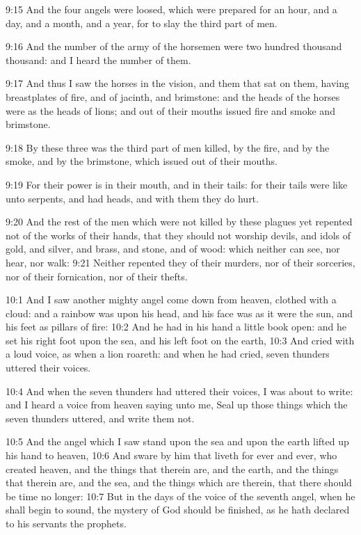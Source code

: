 9:15 And the four angels were loosed, which were prepared for an hour, and a day, and a month, and a year, for to slay the third part of men.

9:16 And the number of the army of the horsemen were two hundred thousand thousand: and I heard the number of them.

9:17 And thus I saw the horses in the vision, and them that sat on them, having breastplates of fire, and of jacinth, and brimstone: and the heads of the horses were as the heads of lions; and out of their mouths issued fire and smoke and brimstone.

9:18 By these three was the third part of men killed, by the fire, and by the smoke, and by the brimstone, which issued out of their mouths.

9:19 For their power is in their mouth, and in their tails: for their tails were like unto serpents, and had heads, and with them they do hurt.

9:20 And the rest of the men which were not killed by these plagues yet repented not of the works of their hands, that they should not worship devils, and idols of gold, and silver, and brass, and stone, and of wood: which neither can see, nor hear, nor walk: 9:21 Neither repented they of their murders, nor of their sorceries, nor of their fornication, nor of their thefts.

10:1 And I saw another mighty angel come down from heaven, clothed with a cloud: and a rainbow was upon his head, and his face was as it were the sun, and his feet as pillars of fire: 10:2 And he had in his hand a little book open: and he set his right foot upon the sea, and his left foot on the earth, 10:3 And cried with a loud voice, as when a lion roareth: and when he had cried, seven thunders uttered their voices.

10:4 And when the seven thunders had uttered their voices, I was about to write: and I heard a voice from heaven saying unto me, Seal up those things which the seven thunders uttered, and write them not.

10:5 And the angel which I saw stand upon the sea and upon the earth lifted up his hand to heaven, 10:6 And sware by him that liveth for ever and ever, who created heaven, and the things that therein are, and the earth, and the things that therein are, and the sea, and the things which are therein, that there should be time no longer: 10:7 But in the days of the voice of the seventh angel, when he shall begin to sound, the mystery of God should be finished, as he hath declared to his servants the prophets.

